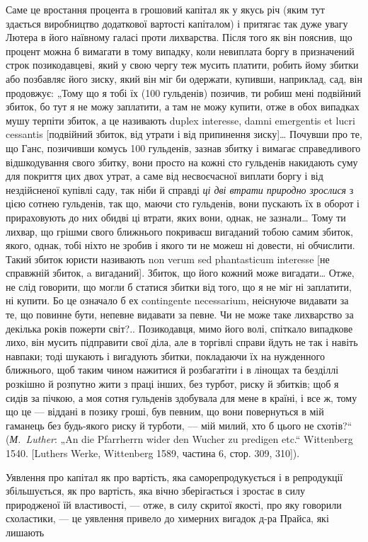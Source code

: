 
Саме це вростання процента в грошовий капітал як у якусь
річ (яким тут здається виробництво додаткової вартості капіталом)
і притягає так дуже увагу Лютера в його наївному
галасі проти лихварства. Після того як він пояснив, що
процент можна б вимагати в тому випадку, коли невиплата
боргу в призначений строк позикодавцеві, який у свою чергу
теж мусить платити, робить йому збитки або позбавляє його
зиску, який він міг би одержати, купивши, наприклад, сад,
він продовжує: „Тому що я тобі їх (100 гульденів) позичив, ти
робиш мені подвійний збиток, бо тут я не можу заплатити,
а там не можу купити, отже в обох випадках мушу терпіти
збиток, а це називають duplex interesse, damni emergentis et
lucri cessantis [подвійний збиток, від утрати і від припинення
зиску]\dots{} Почувши про те, що Ганс, позичивши комусь
100 гульденів, зазнав збитку і вимагає справедливого відшкодування
свого збитку, вони просто на кожні сто гульденів накидають
суму для покриття цих двох утрат, а саме від несвоєчасної
виплати боргу і від нездійсненої купівлі саду, так ніби
й справді \emph{ці дві втрати природно зрослися} з цією сотнею гульденів,
так що, маючи сто гульденів, вони пускають їх в оборот
і прираховують до них обидві ці втрати, яких вони, однак, не
зазнали\dots{} Тому ти лихвар, що грішми свого ближнього покриваєш
вигаданий тобою самим збиток, якого, однак, тобі ніхто
не зробив і якого ти не можеш ні довести, ні обчислити. Такий
збиток юристи називають non verum sed phantasticum interesse [не
справжній збиток, a вигаданий]. Збиток, що його кожний може вигадати\dots{}
Отже, не слід говорити, що могли б статися збитки від
того, що я не міг ні заплатити, ні купити. Бо це означало б ех
contingente necessarium, неіснуюче видавати за те, що повинне
бути, непевне видавати за певне. Чи не може таке лихварство за
декілька років пожерти світ?.. Позикодавця, мимо його волі, спіткало
випадкове лихо, він мусить підправити свої діла, але в торгівлі
справи йдуть не так і навіть навпаки; тоді шукають і вигадують
збитки, покладаючи їх на нужденного ближнього, щоб таким
чином нажитися й розбагатіти і в лінощах та безділлі розкішно
й розпутно жити з праці інших, без турбот, риску й збитків;
щоб я сидів за пічкою, а моя сотня гульденів здобувала для
мене в країні, і все ж, тому що це — віддані в позику гроші, був
певним, що вони повернуться в мій гаманець без будь-якого
риску й турботи, — мій милий, хто б цього не схотів?“ (\emph{М.~Luther}:
„An die Pfarrherrn wider den Wucher zu predigen etc.“ Wittenberg
1540. [Luthers Werke, Wittenberg 1589, частина 6, стор. 309,
310]).

Уявлення про капітал як про вартість, яка саморепродукується
і в репродукції збільшується, як про вартість, яка вічно
зберігається і зростає в силу природженої їй властивості, —
отже, в силу скритої якості, про яку говорили схоластики, — це
уявлення привело до химерних вигадок д-ра Прайса, які лишають
\parbreak{}  %
